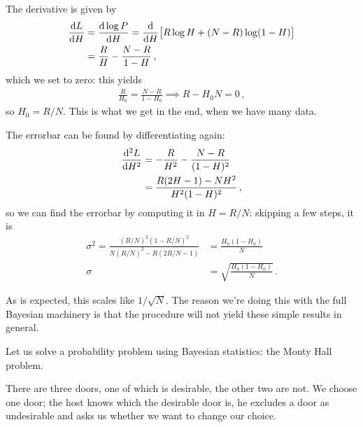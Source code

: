 \documentclass[main.tex]{subfiles}
\begin{document}
The derivative is given by 
%
\begin{align}
\dv{L}{H} &= \dv{\log P }{H} = \dv{}{H} \qty[ R \log H + (N-R) \log (1-H)]  \\
&= \frac{R}{H} - \frac{N-R}{1-H}
\,,
\end{align}
%
which we set to zero: this yields 
%
\begin{align}
\frac{R}{H_0 } = \frac{N-R}{1-H_0 } \implies R - H_0 N = 0
\,,
\end{align}
%
so \(H_0 = R / N\). 
This is what we get in the end, when we have many data. 

The errorbar can be found by differentiating again: 
%
\begin{align}
\dv[2]{L}{H} &= - \frac{R}{H^2} - \frac{N-R}{(1-H)^2}  \\
&= \frac{R (2H-1) - NH^2}{H^2 (1-H)^2} 
\,,
\end{align}
%
so we can find the errorbar by computing it in \(H = R/N\): skipping a few steps, it is
%
\begin{align}
\sigma^2 = \frac{(R/N)^2 (1-R/N)^2}{N (R/N)^2 - R (2 R/N - 1)}
&= \frac{H_0 (1-H_0 )}{N}  \\
\sigma &= \sqrt{\frac{H_0 (1 - H_0 )}{N}}
\,.
\end{align}

As is expected, this scales like \(1 / \sqrt{N}\). 
The reason we're doing this with the full Bayesian machinery is that the procedure will not yield these simple results in general. 

Let us solve a probability problem using Bayesian statistics: the Monty Hall problem. 

There are three doors, one of which is desirable, the other two are not. 
We choose one door; the host knows which the desirable door is, he excludes a door as undesirable and asks us whether we want to change our choice. 
\end{document}
